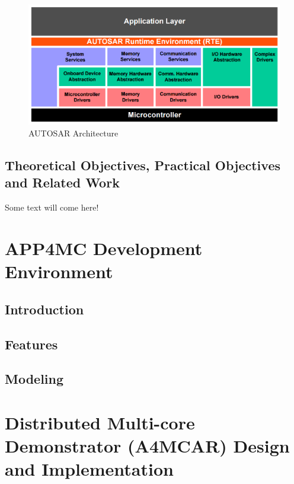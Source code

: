 \begin{figure}[!ht]
	\centering
	\captionsetup{justification=centering}
	\includegraphics[scale=0.35]{content/images/autosararch.png}
	\caption{AUTOSAR Architecture \cite{autosararch}}
	\label{fig:autosararch}
\end{figure}

\section{Theoretical Objectives, Practical Objectives and Related Work}
Some text will come here! \\

\chapter{APP4MC Development Environment} \label{app4mcchapter}
\section{Introduction} %
\section{Features} %
\section{Modeling}
\chapter{Distributed Multi-core Demonstrator (A4MCAR) Design and Implementation} \label{designchapter}
